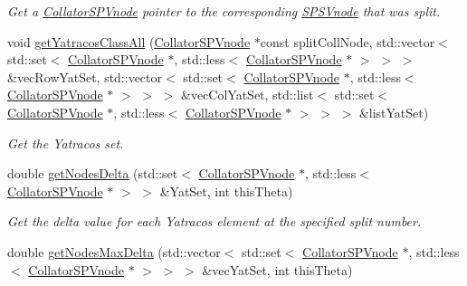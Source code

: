 \begin{DoxyCompactItemize}
\begin{DoxyCompactList}\small\item\em \-Get a \hyperlink{classsubpavings_1_1CollatorSPVnode}{\-Collator\-S\-P\-Vnode} pointer to the corresponding \hyperlink{classsubpavings_1_1SPSVnode}{\-S\-P\-S\-Vnode} that was split. \end{DoxyCompactList}\item 
void \hyperlink{classsubpavings_1_1AdaptiveHistogramVCollator_ad94f1c5c6943e7bb35e74030af5113fd}{get\-Yatracos\-Class\-All} (\hyperlink{classsubpavings_1_1CollatorSPVnode}{\-Collator\-S\-P\-Vnode} $\ast$const split\-Coll\-Node, std\-::vector$<$ std\-::set$<$ \hyperlink{classsubpavings_1_1CollatorSPVnode}{\-Collator\-S\-P\-Vnode} $\ast$, std\-::less$<$ \hyperlink{classsubpavings_1_1CollatorSPVnode}{\-Collator\-S\-P\-Vnode} $\ast$ $>$ $>$ $>$ \&vec\-Row\-Yat\-Set, std\-::vector$<$ std\-::set$<$ \hyperlink{classsubpavings_1_1CollatorSPVnode}{\-Collator\-S\-P\-Vnode} $\ast$, std\-::less$<$ \hyperlink{classsubpavings_1_1CollatorSPVnode}{\-Collator\-S\-P\-Vnode} $\ast$ $>$ $>$ $>$ \&vec\-Col\-Yat\-Set, std\-::list$<$ std\-::set$<$ \hyperlink{classsubpavings_1_1CollatorSPVnode}{\-Collator\-S\-P\-Vnode} $\ast$, std\-::less$<$ \hyperlink{classsubpavings_1_1CollatorSPVnode}{\-Collator\-S\-P\-Vnode} $\ast$ $>$ $>$ $>$ \&list\-Yat\-Set)
\begin{DoxyCompactList}\small\item\em \-Get the \-Yatracos set. \end{DoxyCompactList}\item 
double \hyperlink{classsubpavings_1_1AdaptiveHistogramVCollator_a174349942bc7f76e6804aeb3714d1f3b}{get\-Nodes\-Delta} (std\-::set$<$ \hyperlink{classsubpavings_1_1CollatorSPVnode}{\-Collator\-S\-P\-Vnode} $\ast$, std\-::less$<$ \hyperlink{classsubpavings_1_1CollatorSPVnode}{\-Collator\-S\-P\-Vnode} $\ast$ $>$ $>$ \&\-Yat\-Set, int this\-Theta)
\begin{DoxyCompactList}\small\item\em \-Get the delta value for each \-Yatracos element at the specified split number. \end{DoxyCompactList}\item 
double \hyperlink{classsubpavings_1_1AdaptiveHistogramVCollator_a045c1338ed19503f5485f40ee7d2e218}{get\-Nodes\-Max\-Delta} (std\-::vector$<$ std\-::set$<$ \hyperlink{classsubpavings_1_1CollatorSPVnode}{\-Collator\-S\-P\-Vnode} $\ast$, std\-::less$<$ \hyperlink{classsubpavings_1_1CollatorSPVnode}{\-Collator\-S\-P\-Vnode} $\ast$ $>$ $>$ $>$ \&vec\-Yat\-Set, int this\-Theta)

\end{DoxyCompactItemize}
